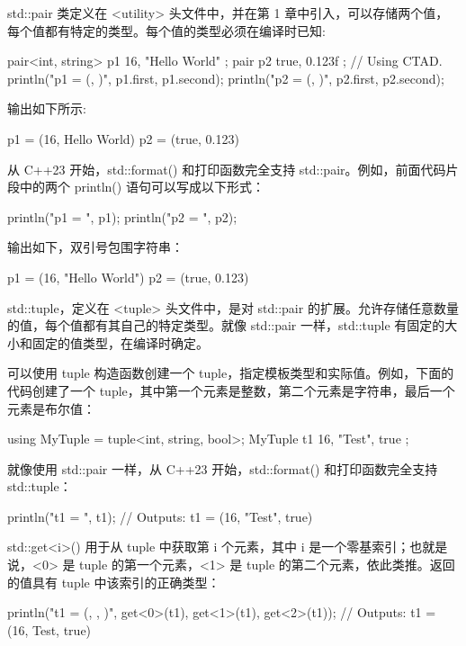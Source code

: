 
std::pair 类定义在 <utility> 头文件中，并在第 1 章中引入，可以存储两个值，每个值都有特定的类型。每个值的类型必须在编译时已知:

\begin{cpp}
pair<int, string> p1 { 16, "Hello World" };
pair p2 { true, 0.123f }; // Using CTAD.
println("p1 = ({}, {})", p1.first, p1.second);
println("p2 = ({}, {})", p2.first, p2.second);
\end{cpp}

输出如下所示:

\begin{shell}
p1 = (16, Hello World)
p2 = (true, 0.123)
\end{shell}

从 C++23 开始，std::format() 和打印函数完全支持 std::pair。例如，前面代码片段中的两个 println() 语句可以写成以下形式：

\begin{cpp}
println("p1 = {}", p1);
println("p2 = {}", p2);
\end{cpp}

输出如下，双引号包围字符串：

\begin{shell}
p1 = (16, "Hello World")
p2 = (true, 0.123)
\end{shell}

std::tuple，定义在 <tuple> 头文件中，是对 std::pair 的扩展。允许存储任意数量的值，每个值都有其自己的特定类型。就像 std::pair 一样，std::tuple 有固定的大小和固定的值类型，在编译时确定。

可以使用 tuple 构造函数创建一个 tuple，指定模板类型和实际值。例如，下面的代码创建了一个 tuple，其中第一个元素是整数，第二个元素是字符串，最后一个元素是布尔值：

\begin{cpp}
using MyTuple = tuple<int, string, bool>;
MyTuple t1 { 16, "Test", true };
\end{cpp}

就像使用 std::pair 一样，从 C++23 开始，std::format() 和打印函数完全支持 std::tuple：

\begin{cpp}
println("t1 = {}", t1);
// Outputs: t1 = (16, "Test", true)
\end{cpp}

std::get<i>() 用于从 tuple 中获取第 i 个元素，其中 i 是一个零基索引；也就是说，<0> 是 tuple 的第一个元素，<1> 是 tuple 的第二个元素，依此类推。返回的值具有 tuple 中该索引的正确类型：

\begin{cpp}
println("t1 = ({}, {}, {})", get<0>(t1), get<1>(t1), get<2>(t1));
// Outputs: t1 = (16, Test, true)
\end{cpp}

